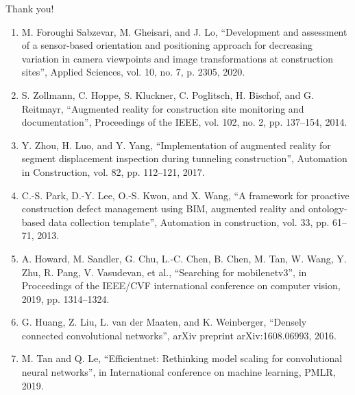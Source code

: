 \documentclass{beamer}%
\begin{document}

\begin{frame}{ }
\footnotesize

\begin{minipage}[t][0.8715\textheight]{\linewidth}
\begin{center}
Thank you! \vspace{1.5ex}
\end{center}

\scriptsize
\begin{enumerate}

\item<1->[[8\text{]}] M. Foroughi Sabzevar, M. Gheisari, and J. Lo, “Development and assessment of a sensor-based orientation and positioning approach for decreasing variation in camera viewpoints and image transformations at construction sites”, Applied Sciences, vol. 10, no. 7, p. 2305, 2020.
\item<1->[[9\text{]}] S. Zollmann, C. Hoppe, S. Kluckner, C. Poglitsch, H. Bischof, and G. Reitmayr, “Augmented reality for construction site monitoring and documentation”,
Proceedings of the IEEE, vol. 102, no. 2, pp. 137–154, 2014.
\item<1->[[10\text{]}] Y. Zhou, H. Luo, and Y. Yang, “Implementation of augmented reality for segment displacement inspection during tunneling construction”, Automation in Construction, vol. 82, pp. 112–121, 2017.
\item<1->[[11\text{]}] C.-S. Park, D.-Y. Lee, O.-S. Kwon, and X. Wang, “A framework for proactive construction defect management using BIM, augmented reality and ontology-based data collection template”, Automation in construction, vol. 33, pp. 61–71, 2013.
\item<1->[[12\text{]}] A. Howard, M. Sandler, G. Chu, L.-C. Chen, B. Chen, M. Tan, W. Wang, Y. Zhu, R. Pang, V. Vasudevan, et al., “Searching for mobilenetv3”, in Proceedings of the IEEE/CVF international conference on computer vision, 2019, pp. 1314–1324.
\item<1->[[13\text{]}] G. Huang, Z. Liu, L. van der Maaten, and K. Weinberger, “Densely connected convolutional networks”, arXiv preprint arXiv:1608.06993, 2016.
\item<1->[[14\text{]}] M. Tan and Q. Le, “Efficientnet: Rethinking model scaling for convolutional neural networks”, in International conference on machine learning, PMLR, 2019.


\end{enumerate}


\vspace{3ex}%
\end{minipage}



\end{frame}
\end{document}
